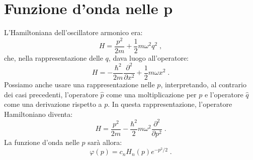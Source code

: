 \documentclass[10pt,a4paper]{report}
\theoremstyle{definition}
\numberwithin{equation}{section}
\begin{document}
\section{Funzione d'onda nelle p}
L'Hamiltoniana dell'oscillatore armonico era:
\begin{equation}
H=\frac{p^2}{2m}+\frac{1}{2}m\omega^2q^2\;,
\end{equation}
che, nella rappresentazione delle $q$, dava luogo all'operatore:
$$
H=-\frac{\hbar^2}{2m}\frac{\partial^2}{\partial x^2}+\frac{1}{2}m\omega x^2\;.
$$
Possiamo anche usare una rappresentazione nelle $p$, interpretando, al contrario dei casi precedenti, l'operatore $\hat{p}$ come una moltiplicazione per $p$ e l'operatore $\hat{q}$ come una derivazione rispetto a $p$. In questa rappresentazione, l'operatore Hamiltoniano diventa:
\begin{equation}
H=\frac{p^2}{2m}-\frac{\hbar^2}{2}m\omega^2\frac{\partial^2}{\partial p^2}\;.
\end{equation}
La funzione d'onda nelle $p$ sarà allora:
\begin{equation}
\varphi(p)=c_nH_n(p)e^{-p^2/2}\;.
\end{equation}
\end{document}
